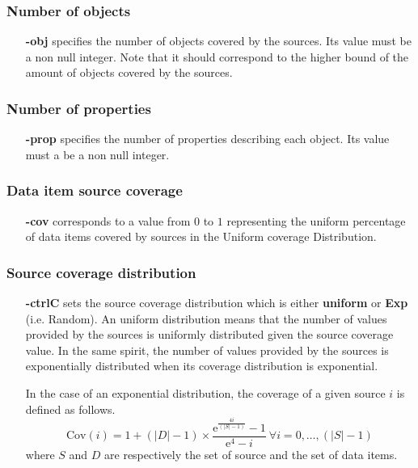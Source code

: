 \documentclass[a4paper,10pt]{scrartcl}
\newcommand{\cov}[1]{\ensuremath{\mathrm{Cov}(#1)}}
\newcommand{\expo}[1]{\ensuremath{\mathrm{e}^{#1}}}
\begin{document}
\subsubsection{Number of objects}
 \begin{itemize}
 \item[\textbf{-obj}] specifies the number of objects covered by the sources. Its value must be a non null integer.
 Note that it should correspond to the higher bound of the amount of objects covered by the sources.
 \end{itemize}
\subsubsection{Number of properties}
 \begin{itemize}
 \item[\textbf{-prop}] specifies the number of properties describing each object. Its value must a be a non null integer.
 \end{itemize}
 \subsubsection{Data item source coverage}
 \begin{itemize}
 \item[\textbf{-cov}] corresponds to a value from $0$ to $1$ representing the uniform percentage 
 of data items covered by sources in the Uniform coverage Distribution.
\end{itemize}
\subsubsection{Source coverage distribution}
\begin{itemize}
\item[\textbf{-ctrlC}] sets the source coverage distribution which is either \textbf{uniform} or \textbf{Exp} (i.e. Random).
 An uniform distribution means that the number of values provided by the sources is uniformly
 distributed given the source coverage value. In the same spirit, the number of values provided 
 by the sources is exponentially distributed when its coverage distribution is exponential.
 
 In the case of an exponential distribution, the coverage of a given source $i$ is defined as follows.
 \[
  \cov{i} = 1 + (|D|-1)\times \frac{\expo{\frac{4i}{(|S|-1)}} - 1}{\expo{4}-i}~\forall i=0,\ldots,(|S| -1)
 \]
where $S$ and $D$ are respectively the set of source and the set of data items. 
 
\end{itemize}
\end{document}
